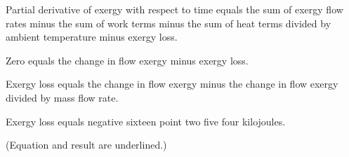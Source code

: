 Partial derivative of exergy with respect to time equals the sum of exergy flow rates minus the sum of work terms minus the sum of heat terms divided by ambient temperature minus exergy loss.  

Zero equals the change in flow exergy minus exergy loss.  

Exergy loss equals the change in flow exergy minus the change in flow exergy divided by mass flow rate.  

Exergy loss equals negative sixteen point two five four kilojoules.  

(Equation and result are underlined.)